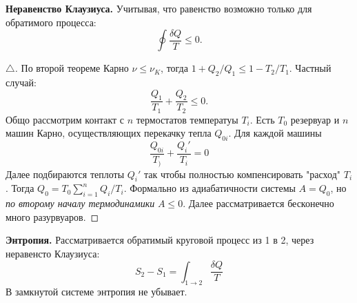 \phantom{42}

\noindent
\textbf{Неравенство Клаузиуса.} Учитывая, что равенство возможно только для обратимого процесса:
\begin{equation}
    \oint \frac{\delta Q}{T} \leqslant 0.
\end{equation}

\begin{proof}[$\triangle$]
По второй теореме Карно $\nu \leqslant \nu_K $, тогда $1 + Q_2/Q_1 \leqslant 1 - T_2/T_1$. Частный случай:
$$
\frac{Q_1}{T_1} + \frac{Q_2}{T_2}  \leqslant 0.
$$
Общо рассмотрим контакт с $n$ термостатов температуы $T_i$. Есть $T_0$ резервуар  и $n$ машин  Карно, осуществляющих перекачку тепла $Q_{0i}$. Для каждой машины
$$
\frac{Q_{0i}}{T_)} + \frac{Q_i'}{T_i} = 0
$$
Далее подбираются теплоты $Q_i'$ так чтобы полностью компенсировать "расход" $T_i$. Тогда $Q_0 = T_0 \sum_{i=1}^{n} Q_i / T_i$. Формально из адиабатичности системы $A = Q_0$, но \textit{по второму началу термодинамики} $A \leqslant 0$. Далее рассматривается бесконечно много разурвуаров. 
\end{proof}

\phantom{42}

\noindent 
\textbf{Энтропия.} Рассматривается обратимый круговой процесс из 1 в 2, через неравенсто Клаузиуса:
\begin{equation}
    S_2 - S_1 = \int_{1 \to 2} \frac{\delta Q}{T}
\end{equation}
В замкнутой системе энтропия не убывает.












